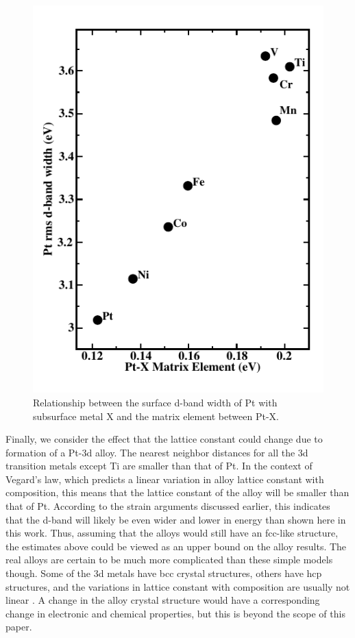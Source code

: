 \documentclass[aps,preprint,superscriptaddress,endfloats*]{revtex4}
\begin{document}
\begin{figure}
\includegraphics{figures/figure3}
\caption{Relationship between the surface d-band width of Pt with
  subsurface metal X and the matrix element between Pt-X.}
\label{fig:V:width}
\end{figure}

Finally, we consider the effect that the lattice constant could change
due to formation of a Pt-3d alloy. The nearest neighbor distances for
all the 3d transition metals except Ti are smaller than that of Pt. In
the context of Vegard's law, which predicts a linear variation in
alloy lattice constant with composition, this means that the lattice
constant of the alloy will be smaller than that of Pt.  According to
the strain arguments discussed earlier, this indicates that the d-band
will likely be even wider and lower in energy than shown here in this
work.  Thus, assuming that the alloys would still have an fcc-like
structure, the estimates above could be viewed as an upper bound on
the alloy results.  The real alloys are certain to be much more
complicated than these simple models though. Some of the 3d metals
have bcc crystal structures, others have hcp structures, and the
variations in lattice constant with composition are usually not linear
\cite{gschneidner1962:_depar_law}.  A change in the alloy crystal
structure would have a corresponding change in electronic and chemical
properties, but this is beyond the scope of this paper.
\end{document}
